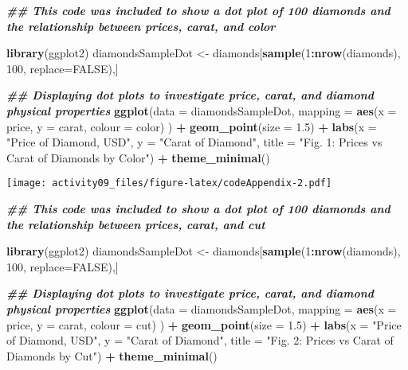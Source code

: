 \documentclass[
]{article}
\newenvironment{Shaded}{\begin{snugshade}}{\end{snugshade}}
\newcommand{\AttributeTok}[1]{\textcolor[rgb]{0.13,0.29,0.53}{#1}}
\newcommand{\ConstantTok}[1]{\textcolor[rgb]{0.56,0.35,0.01}{#1}}
\newcommand{\DecValTok}[1]{\textcolor[rgb]{0.00,0.00,0.81}{#1}}
\newcommand{\DocumentationTok}[1]{\textcolor[rgb]{0.56,0.35,0.01}{\textbf{\textit{#1}}}}
\newcommand{\FloatTok}[1]{\textcolor[rgb]{0.00,0.00,0.81}{#1}}
\newcommand{\FunctionTok}[1]{\textcolor[rgb]{0.13,0.29,0.53}{\textbf{#1}}}
\newcommand{\NormalTok}[1]{#1}
\newcommand{\OtherTok}[1]{\textcolor[rgb]{0.56,0.35,0.01}{#1}}
\newcommand{\SpecialCharTok}[1]{\textcolor[rgb]{0.81,0.36,0.00}{\textbf{#1}}}
\newcommand{\StringTok}[1]{\textcolor[rgb]{0.31,0.60,0.02}{#1}}
\begin{document}
\begin{Shaded}
\begin{Highlighting}[]
\DocumentationTok{\#\# This code was included to show a dot plot of 100 diamonds and the relationship between prices, carat, and color}

\FunctionTok{library}\NormalTok{(ggplot2)}
\NormalTok{diamondsSampleDot }\OtherTok{\textless{}{-}}\NormalTok{ diamonds[}\FunctionTok{sample}\NormalTok{(}\DecValTok{1}\SpecialCharTok{:}\FunctionTok{nrow}\NormalTok{(diamonds), }\DecValTok{100}\NormalTok{, }\AttributeTok{replace=}\ConstantTok{FALSE}\NormalTok{),]}

\DocumentationTok{\#\# Displaying dot plots to investigate price, carat, and diamond physical properties}
\FunctionTok{ggplot}\NormalTok{(}\AttributeTok{data =}\NormalTok{ diamondsSampleDot, }\AttributeTok{mapping =} \FunctionTok{aes}\NormalTok{(}\AttributeTok{x =}\NormalTok{ price, }\AttributeTok{y =}\NormalTok{ carat, }\AttributeTok{colour =}\NormalTok{ color) ) }\SpecialCharTok{+}
\FunctionTok{geom\_point}\NormalTok{(}\AttributeTok{size =} \FloatTok{1.5}\NormalTok{) }\SpecialCharTok{+} 
\FunctionTok{labs}\NormalTok{(}\AttributeTok{x =} \StringTok{"Price of Diamond, USD"}\NormalTok{, }\AttributeTok{y =} \StringTok{"Carat of Diamond"}\NormalTok{, }\AttributeTok{title =} \StringTok{"Fig. 1: Prices vs Carat of Diamonds by Color"}\NormalTok{) }\SpecialCharTok{+}
\FunctionTok{theme\_minimal}\NormalTok{()}
\end{Highlighting}
\end{Shaded}

\texttt{[image: activity09\_files/figure-latex/codeAppendix-2.pdf]}

\begin{Shaded}
\begin{Highlighting}[]
\DocumentationTok{\#\# This code was included to show a dot plot of 100 diamonds and the relationship between prices, carat, and cut}

\FunctionTok{library}\NormalTok{(ggplot2)}
\NormalTok{diamondsSampleDot }\OtherTok{\textless{}{-}}\NormalTok{ diamonds[}\FunctionTok{sample}\NormalTok{(}\DecValTok{1}\SpecialCharTok{:}\FunctionTok{nrow}\NormalTok{(diamonds), }\DecValTok{100}\NormalTok{, }\AttributeTok{replace=}\ConstantTok{FALSE}\NormalTok{),]}

\DocumentationTok{\#\# Displaying dot plots to investigate price, carat, and diamond physical properties}
\FunctionTok{ggplot}\NormalTok{(}\AttributeTok{data =}\NormalTok{ diamondsSampleDot, }\AttributeTok{mapping =} \FunctionTok{aes}\NormalTok{(}\AttributeTok{x =}\NormalTok{ price, }\AttributeTok{y =}\NormalTok{ carat, }\AttributeTok{colour =}\NormalTok{ cut) ) }\SpecialCharTok{+}
\FunctionTok{geom\_point}\NormalTok{(}\AttributeTok{size =} \FloatTok{1.5}\NormalTok{) }\SpecialCharTok{+} 
\FunctionTok{labs}\NormalTok{(}\AttributeTok{x =} \StringTok{"Price of Diamond, USD"}\NormalTok{, }\AttributeTok{y =} \StringTok{"Carat of Diamond"}\NormalTok{, }\AttributeTok{title =} \StringTok{"Fig. 2: Prices vs Carat of Diamonds by Cut"}\NormalTok{) }\SpecialCharTok{+}
\FunctionTok{theme\_minimal}\NormalTok{()}
\end{Highlighting}
\end{Shaded}
\end{document}
